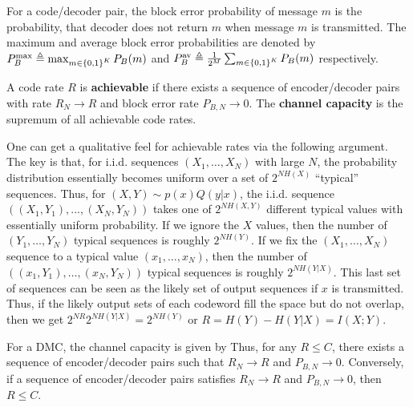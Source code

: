 \documentclass[letterpaper,10pt,english]{article}
\begin{document}
\begin{defn}
For a code/decoder pair, the block error probability of message $m$ is the probability, 
that decoder does not return $m$ when message $m$ is transmitted. 
The maximum and average block error probabilities are denoted by $P_B^{\max} \triangleq \max_{m \in \left\{0,1\right\}^K} P_B(m)$ and $P_B^{\text{av}} \triangleq \frac{1}{2^M}\sum_{m \in \left\{0,1\right\}^K}P_B(m)$ respectively. 
\end{defn} 
\begin{defn}
A code rate $R$ is \textbf{achievable} if there exists a sequence of encoder/decoder pairs with rate $R_N \to R$ and block error rate $P_{B,N} \to 0$. 
The \textbf{channel capacity} is the supremum of all achievable code rates.
\end{defn}
\begin{rem} 
One can get a qualitative feel for achievable rates via the following argument. 
The key is that, for i.i.d. sequences $(X_1,  \dots , X_N)$ with large $N$, 
the probability distribution essentially becomes uniform over a set of $2^{NH(X)}$ ``typical'' sequences. 
Thus, for $(X,Y) \sim p(x)Q(y|x)$, the i.i.d. sequence $((X_1, Y_1), . . . , (X_N , Y_N))$ takes one of 
$2^{NH(X,Y)}$ different typical values with essentially uniform probability. 
If we ignore the $X$ values, then the number of $(Y_1, \dots, Y_N)$ typical sequences is roughly $2^{NH(Y)}$. 
If we fix the $(X_1, \dots, X_N)$ sequence to a typical value $(x_1, \dots, x_N)$, 
then the number of $((x_1,Y_1), \dots, (x_N,Y_N))$ typical sequences is roughly $2^{NH(Y|X)}$. 
This last set of sequences can be seen as the likely set of output sequences if $x$ is transmitted. 
Thus, if the likely output sets of each codeword fill the space but do not overlap, then we get $2^{NR}2^{NH(Y|X)} = 2^{NH(Y)}$ or $R=H(Y) -H(Y|X)=I(X;Y)$. 
\end{rem}
\begin{thm}  
For a DMC, the channel capacity is given by
Thus, for any $R \le C$, there exists a sequence of encoder/decoder pairs such that $R_N \to R$ and $P_{B,N} \to 0$. 
Conversely, if a sequence of encoder/decoder pairs satisfies $R_N \to R$ and $P_{B,N}  \to 0$, then $R \le C$. 
\end{thm}
\end{document}
